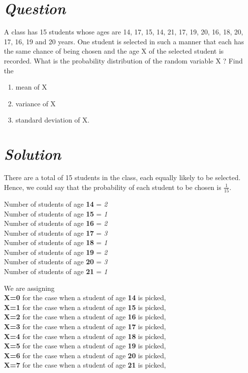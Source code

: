 \documentclass[journal,12pt,twocolumn]{IEEEtran}
\begin{document}
\section * {\emph{Question}}
A class has 15 students whose ages are 14, 17, 15, 14, 21, 17, 19, 20, 16, 18, 20, 17, 16, 19 and 20 years. One student is selected in such a manner that each has the same chance of being chosen and the age X of the selected student is recorded. What is the  probability distribution of the random variable X ? Find the 
\begin{enumerate}
    \item mean of X
    \item variance of X
    \item standard deviation of X.
\end{enumerate}
\section*{\emph{Solution}}
There are a total of 15 students in the class, each equally likely to be selected.
\\Hence, we could say that the probability of each student to be chosen is \textbf{$\frac{1}{15}$}.

   Number of students of age \textbf{14} = \emph{2}
\\ Number of students of age \textbf{15} = \emph{1}
\\ Number of students of age \textbf{16} = \emph{2}
\\ Number of students of age \textbf{17} = \emph{3}
\\ Number of students of age \textbf{18} = \emph{1}
\\ Number of students of age \textbf{19} = \emph{2}
\\ Number of students of age \textbf{20} = \emph{3}
\\ Number of students of age \textbf{21} = \emph{1}

We are assigning 
\\  \textbf{X=0} for the case when a student of age \textbf{14} is picked,
\\  \textbf{X=1} for the case when a student of age \textbf{15} is picked, 
\\  \textbf{X=2} for the case when a student of age \textbf{16} is picked,
\\  \textbf{X=3} for the case when a student of age \textbf{17} is picked,
\\  \textbf{X=4} for the case when a student of age \textbf{18} is picked,
\\  \textbf{X=5} for the case when a student of age \textbf{19} is picked,
\\  \textbf{X=6} for the case when a student of age \textbf{20} is picked,
\\  \textbf{X=7} for the case when a student of age \textbf{21} is picked,
\end{document}
